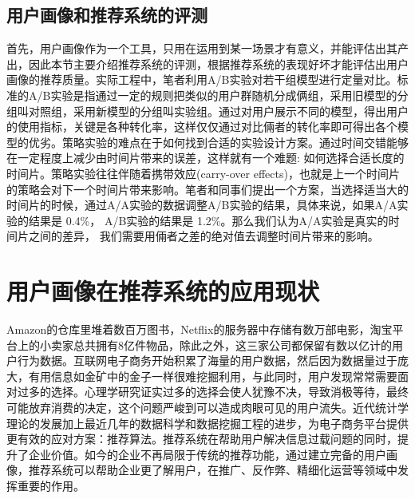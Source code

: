 		\subsection{用户画像和推荐系统的评测}
		首先，用户画像作为一个工具，只用在运用到某一场景才有意义，并能评估出其产出，因此本节主要介绍推荐系统的评测，根据推荐系统的表现好坏才能评估出用户画像的推荐质量。实际工程中，笔者利用A/B实验对若干组模型进行定量对比。标准的A/B实验是指通过一定的规则把类似的用户群随机分成俩组，采用旧模型的分组叫对照组，采用新模型的分组叫实验组\citep{ab-test}。通过对用户展示不同的模型，得出用户的使用指标，关键是各种转化率，这样仅仅通过对比倆者的转化率即可得出各个模型的优劣。策略实验的难点在于如何找到合适的实验设计方案。通过时间交错能够在一定程度上减少由时间片带来的误差，这样就有一个难题:  如何选择合适长度的时间片。策略实验往往伴随着携带效应(carry-over effects)，也就是上一个时间片的策略会对下一个时间片带来影响。笔者和同事们提出一个方案，当选择适当大的时间片的时候，通过A/A实验的数据调整A/B实验的结果，具体来说，如果A/A实验的结果是 0.4\%， A/B实验的结果是 1.2\%。那么我们认为A/A实验是真实的时间片之间的差异， 我们需要用倆者之差的绝对值去调整时间片带来的影响。

	\section{用户画像在推荐系统的应用现状}
	Amazon的仓库里堆着数百万图书，Netflix的服务器中存储有数万部电影，淘宝平台上的小卖家总共拥有8亿件物品，除此之外，这三家公司都保留有数以亿计的用户行为数据。互联网电子商务开始积累了海量的用户数据，然后因为数据量过于庞大，有用信息如金矿中的金子一样很难挖掘利用，与此同时，用户发现常常需要面对过多的选择。心理学研究证实过多的选择会使人犹豫不决，导致消极等待，最终可能放弃消费的决定，这个问题严峻到可以造成肉眼可见的用户流失。近代统计学理论的发展加上最近几年的数据科学和数据挖掘工程的进步，为电子商务平台提供更有效的应对方案：推荐算法。推荐系统在帮助用户解决信息过载问题的同时，提升了企业价值。如今的企业不再局限于传统的推荐功能，通过建立完备的用户画像，推荐系统可以帮助企业更了解用户，在推广、反作弊、精细化运营等领域中发挥重要的作用。
